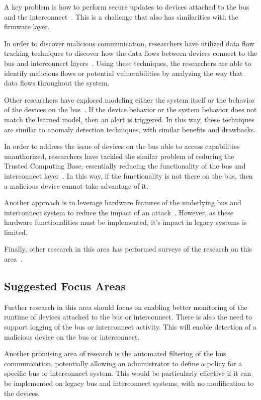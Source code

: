 \documentclass[11pt,letterpaper]{article}
\begin{document}
A key problem is how to perform secure updates to devices attached to
the bus and the interconnect~\cite{Larson2008}. This is a challenge
that also has similarities with the firmware layer.

In order to discover malicious communication, researchers have
utilized data flow tracking techniques to discover how the data flows
between devices connect to the bus and interconnect
layers~\cite{Schweppe2012}. Using these techniques, the researchers
are able to identify malicious flows or potential vulnerabilities by
analyzing the way that data flows throughout the system.

Other researchers have explored modeling either the system itself
or the behavior of the devices on the bus~\cite{Stewin2013a,
  Drolia2011}. If the device behavior or the system behavior does not
match the learned model, then an alert is triggered. In this way,
these techniques are similar to anomaly detection techniques, with
similar benefits and drawbacks. 

In order to address the issue of devices on the bus able to access
capabilities unauthorized, researchers have tackled the similar
problem of reducing the Trusted Computing Base, essentially reducing
the functionality of the bus and interconnect
layer~\cite{Vasudevan2012, Zhang2013, Zhou2009}. In this way, if the
functionality is not there on the bus, then a malicious device cannot
take advantage of it.

Another approach is to leverage hardware features of the underlying
bus and interconnect system to reduce the impact of an
attack~\cite{Wolf2012, Wojtczuk2011}. However, as these hardware
functionalities must be implemented, it's impact in legacy systems is
limited.

Finally, other research in this area has performed surveys of the
research on this area~\cite{Kleberger2011, Studnia2013, Thom2008,
  Wolf2004, Wolf2007, Wright2011, Zhao2002}.

\subsection{Suggested Focus Areas}

Further research in this area should focus on enabling better
monitoring of the runtime of devices attached to the bus or
interconnect. There is also the need to support logging of the bus or
interconnect activity. This will enable detection of a malicious
device on the bus or interconnect.

Another promising area of research is the automated filtering of
the bus communication, potentially allowing an administrator to define
a policy for a specific bus or interconnect system. This would be
particularly effective if it can be implemented on legacy bus and
interconnect systems, with no modification to the devices.
\end{document}
